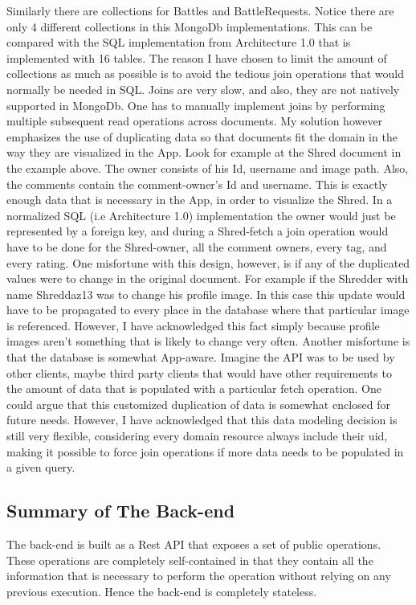 Similarly there are collections for Battles and BattleRequests. Notice there are only 4 different collections in this MongoDb implementations. This can be compared with the SQL implementation from Architecture 1.0 that is implemented with 16 tables. The reason I have chosen to limit the amount of collections as much as possible is to avoid the tedious join operations that would normally be needed in SQL. Joins are very slow, and also, they are not natively supported in MongoDb. One has to manually implement joins by performing multiple subsequent read operations across documents. My solution however emphasizes the use of duplicating data so that documents fit the domain in the way they are visualized in the App. Look for example at the Shred document in the example above. The owner consists of his Id, username and image path. Also, the comments contain the comment-owner's Id and username. This is exactly enough data that is necessary in the App, in order to visualize the Shred. In a normalized SQL (i.e Architecture 1.0) implementation the owner would just be represented by a foreign key, and during a Shred-fetch a join operation would have to be done for the Shred-owner, all the comment owners, every tag, and every rating. One misfortune with this design, however, is if any of the duplicated values were to change in the original document. For example if the Shredder with name Shreddaz13 was to change his profile image. In this case this update would have to be propagated to every place in the database where that particular image is referenced. However, I have acknowledged this fact simply because profile images aren't something that is likely to change very often. Another misfortune is that the database is somewhat App-aware. Imagine the API was to be used by other clients, maybe third party clients that would have other requirements to the amount of data that is populated with a particular fetch operation. One could argue that this customized duplication of data is somewhat enclosed for future needs. However, I have acknowledged that this data modeling decision is still very flexible, considering every domain resource always include their uid, making it possible to force join operations if more data needs to be  populated in a given query. 

\subsection{Summary of The Back-end}
The back-end is built as a Rest API that exposes a set of public operations. These operations are completely self-contained in that they contain all the information that is necessary to perform the operation without relying on any previous execution. Hence the back-end is completely stateless. 

